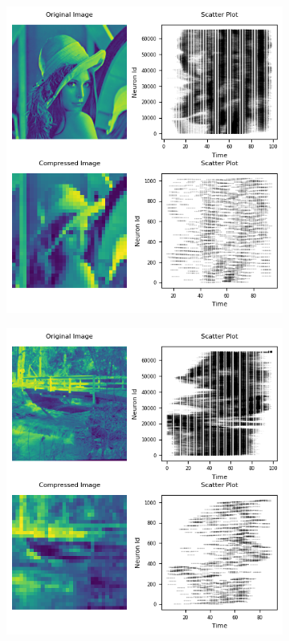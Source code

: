 \documentclass[12pt]{article}
\begin{document}
\begin{figure}[H]
\begin{subfigure}[b]{0.45\textwidth}
  \end{subfigure}
  \\[\smallskipamount]
  \begin{subfigure}[b]{0.45\textwidth}
    \includegraphics[width=\textwidth]{Figs/nc_lena.png}
  \end{subfigure}
  \hfill
  \begin{subfigure}[b]{0.45\textwidth}
    \includegraphics[width=\textwidth]{Figs/nc_bridge.png}

\end{subfigure}
\end{figure}
\end{document}

